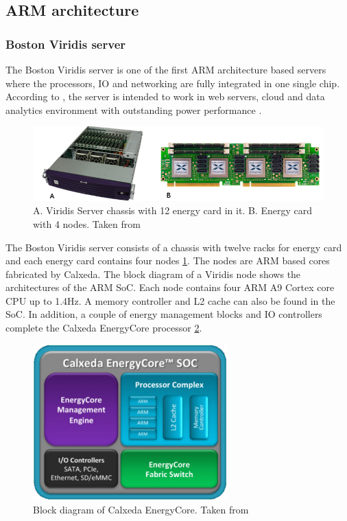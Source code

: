 \subsection{ARM architecture}
\subsubsection{Boston Viridis server}

The Boston Viridis server is one of the first ARM architecture based servers
where the processors, IO and networking are fully integrated in one single chip.
According to \cite{VIRIDIS}, the server is intended to work in web servers,
cloud and data analytics environment with outstanding power performance
\cite{VIRIDIS}.

\vspace{5mm}

\begin{figure}[h!]
  \centering
    \includegraphics[width=\textwidth]{"img/viridis&SoC"}
    \caption{A. Viridis Server chassis with 12 energy card in it. B. Energy card
with 4 nodes. Taken from \cite{VIRIDIS}}
    \label{fig:viridis&SoC}
\end{figure}

\vspace{5mm}


The Boston Viridis server consists of a chassis with twelve racks for energy
card and each energy card contains four nodes \ref{fig:viridis&SoC}. The nodes are ARM based cores
fabricated by Calxeda. The block diagram of a Viridis node shows the
architectures of the ARM SoC. Each node contains four ARM A9 Cortex core CPU up
to 1.4Hz. A memory controller and L2 cache can also be found in the SoC. In
addition, a couple of energy management blocks and IO controllers complete the
Calxeda EnergyCore processor \ref{fig:calxedaSOC}.


\begin{figure}[h!]
  \centering
    \includegraphics[width=75mm]{"img/calxedaSOC"}
    \caption{Block diagram of Calxeda EnergyCore. Taken from \cite{VIRIDIS}}
    \label{fig:calxedaSOC}
\end{figure}

